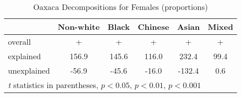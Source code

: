 \begin{table}[htbp]\centering
\caption{Oaxaca Decompositions for Females (proportions)}
\begin{tabular}{l*{5}{c}}
\hline\hline
          &Non-white&    Black&  Chinese&    Asian&    Mixed\\
\hline
overall   &    +     &      +   &   +      &    +     &     +    \\
explained &    156.9\sym{***}&    145.6\sym{***}&    116.0\sym{***}&    232.4\sym{***}&     99.4\sym{***}\\
unexplained&    -56.9\sym{***}&    -45.6\sym{***}&    -16.0&   -132.4\sym{***}&      0.6\\
\hline\hline
\multicolumn{6}{l}{\footnotesize \textit{t} statistics in parentheses, \sym{*} \(p<0.05\), \sym{**} \(p<0.01\), \sym{***} \(p<0.001\)}\\
\end{tabular}
\label{tab:oaxaca_pct_female}
\end{table}
